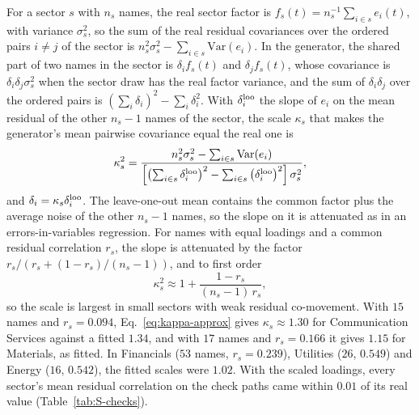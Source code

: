 For a sector $s$ with $n_s$ names, the real sector factor is $f_s(t) = n_s^{-1}\sum_{i \in s} e_i(t)$, with variance $\sigma_s^2$, so the sum of
the real residual covariances over the ordered pairs $i \ne j$ of the sector is
$n_s^2 \sigma_s^2 - \sum_{i \in s} \mathrm{Var}(e_i)$. In the generator, the shared part of two names in the sector
is $\delta_i f_s(t)$ and $\delta_j f_s(t)$, whose covariance is $\delta_i \delta_j \sigma_s^2$ when the sector draw has
the real factor variance, and the sum of $\delta_i \delta_j$ over the ordered pairs is
$(\sum_i \delta_i)^2 - \sum_i \delta_i^2$. With $\delta_i^{\rm loo}$ the slope of $e_i$ on the mean residual of the other $n_s - 1$ names of the sector,
the scale $\kappa_s$ that makes the generator's mean pairwise covariance equal the real one is
\begin{equation}
  \kappa_s^2 = \frac{n_s^2 \sigma_s^2 - \sum_{i \in s} \mathrm{Var}(e_i)}
    {\left[\left(\sum_{i \in s} \delta_i^{\rm loo}\right)^2 - \sum_{i \in s} \left(\delta_i^{\rm loo}\right)^2\right]
    \sigma_s^2},
  \label{eq:kappa}
\end{equation}
and $\delta_i = \kappa_s \delta_i^{\rm loo}$. The leave-one-out mean contains the common factor plus the average
noise of the other $n_s - 1$ names, so the slope on it is attenuated as in an errors-in-variables regression. For
names with equal loadings and a common residual correlation $r_s$, the slope is attenuated by the factor
$r_s/(r_s + (1 - r_s)/(n_s - 1))$, and to first order
\begin{equation}
  \kappa_s^2 \approx 1 + \frac{1 - r_s}{(n_s - 1)\, r_s},
  \label{eq:kappa-approx}
\end{equation}
so the scale is largest in small sectors with weak residual co-movement. With $15$ names and $r_s = 0.094$,
Eq.~\eqref{eq:kappa-approx} gives $\kappa_s \approx 1.30$ for Communication Services against a fitted $1.34$, and with $17$ names and
$r_s = 0.166$ it gives $1.15$ for Materials, as fitted. In Financials ($53$ names, $r_s = 0.239$), Utilities ($26$,
$0.549$) and Energy ($16$, $0.542$), the fitted scales were $1.02$. With the scaled loadings, every sector's mean
residual correlation on the check paths came within $0.01$ of its real value (Table~\ref{tab:S-checks}).

